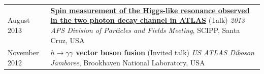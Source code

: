 \documentclass{letter}
\begin{document}
\begin{tabular}{p{}p{}}


  August 2013
  &
  \href{https://indico.bnl.gov/contributionDisplay.py?contribId=155&sessionId=9&confId=603}{\textbf{Spin measurement of the Higgs-like resonance observed in the two photon decay channel in ATLAS}} (Talk) \newline
  \textit{2013 APS Division of Particles and Fields Meeting}, SCIPP, Santa Cruz, USA \newline
  \\

  November 2012
  &
  \textbf{$h\rightarrow \gamma \gamma$ vector boson fusion} (Invited talk) \newline
  \textit{US ATLAS Diboson Jamboree}, Brookhaven National Laboratory, USA \newline


\end{tabular}
\vspace{-10pt}


\begin{flushleft}
  \Large{\textsc{\textbf{\color{Maroon}{References}}}}
\end{flushleft}
\end{document}
